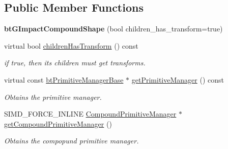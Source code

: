 \subsection*{Public Member Functions}
\begin{DoxyCompactItemize}
\item 
\mbox{\label{classbtGImpactCompoundShape_a315f703c2006537efde116aceef17b57}} 
{\bfseries bt\+G\+Impact\+Compound\+Shape} (bool children\+\_\+has\+\_\+transform=true)
\item 
\mbox{\label{classbtGImpactCompoundShape_ab5879b0f493aee95f2703c196ace6f21}} 
virtual bool \hyperlink{classbtGImpactCompoundShape_ab5879b0f493aee95f2703c196ace6f21}{children\+Has\+Transform} () const
\begin{DoxyCompactList}\small\item\em if true, then its children must get transforms. \end{DoxyCompactList}\item 
\mbox{\label{classbtGImpactCompoundShape_ac27e9ff4012de1dd02d8e58ba9f4533d}} 
virtual const \hyperlink{classbtPrimitiveManagerBase}{bt\+Primitive\+Manager\+Base} $\ast$ \hyperlink{classbtGImpactCompoundShape_ac27e9ff4012de1dd02d8e58ba9f4533d}{get\+Primitive\+Manager} () const
\begin{DoxyCompactList}\small\item\em Obtains the primitive manager. \end{DoxyCompactList}\item 
\mbox{\label{classbtGImpactCompoundShape_a5608f37c18454c3e82504120e053f67a}} 
S\+I\+M\+D\+\_\+\+F\+O\+R\+C\+E\+\_\+\+I\+N\+L\+I\+NE \hyperlink{classbtGImpactCompoundShape_1_1CompoundPrimitiveManager}{Compound\+Primitive\+Manager} $\ast$ \hyperlink{classbtGImpactCompoundShape_a5608f37c18454c3e82504120e053f67a}{get\+Compound\+Primitive\+Manager} ()
\begin{DoxyCompactList}\small\item\em Obtains the compopund primitive manager. \end{DoxyCompactList}\item 
\mbox{\label{classbtGImpactCompoundShape_ae0673a0cf5bb33ed1e3b18b3c2565811}} 

\end{DoxyCompactItemize}
